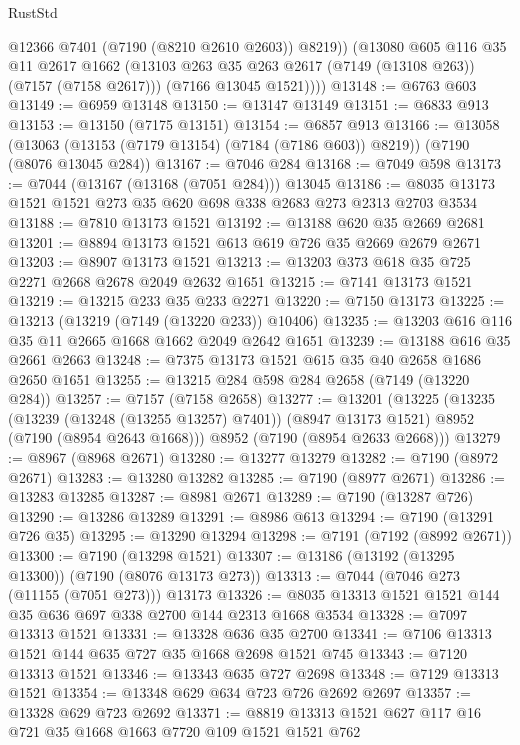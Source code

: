 \begin{lexlean}{RustStd}
\begin{coremodule}
            @12366
            @7401
            (@7190 (@8210 @2610 @2603))
            @8219))
        (@13080
          @605
          @116
          @35
          @11
          @2617
          @1662
          (@13103 @263 @35 @263 @2617 (@7149 (@13108 @263)) (@7157 (@7158 @2617)))
          (@7166 @13045 @1521))))
@13148 := @6763 @603
@13149 := @6959 @13148
@13150 := @13147 @13149
@13151 := @6833 @913
@13153 := @13150 (@7175 @13151)
@13154 := @6857 @913
@13166 := @13058
    (@13063 (@13153 (@7179 @13154) (@7184 (@7186 @603)) @8219))
    (@7190 (@8076 @13045 @284))
@13167 := @7046 @284
@13168 := @7049 @598
@13173 := @7044 (@13167 (@13168 (@7051 @284))) @13045
@13186 := @8035 @13173 @1521 @1521 @273 @35 @620 @698 @338 @2683 @273 @2313 @2703 @3534
@13188 := @7810 @13173 @1521
@13192 := @13188 @620 @35 @2669 @2681
@13201 := @8894 @13173 @1521 @613 @619 @726 @35 @2669 @2679 @2671
@13203 := @8907 @13173 @1521
@13213 := @13203 @373 @618 @35 @725 @2271 @2668 @2678 @2049 @2632 @1651
@13215 := @7141 @13173 @1521
@13219 := @13215 @233 @35 @233 @2271
@13220 := @7150 @13173
@13225 := @13213 (@13219 (@7149 (@13220 @233)) @10406)
@13235 := @13203 @616 @116 @35 @11 @2665 @1668 @1662 @2049 @2642 @1651
@13239 := @13188 @616 @35 @2661 @2663
@13248 := @7375 @13173 @1521 @615 @35 @40 @2658 @1686 @2650 @1651
@13255 := @13215 @284 @598 @284 @2658 (@7149 (@13220 @284))
@13257 := @7157 (@7158 @2658)
@13277 := @13201
    (@13225
      (@13235
        (@13239 (@13248 (@13255 @13257) @7401))
        (@8947 @13173 @1521)
        @8952
        (@7190 (@8954 @2643 @1668)))
      @8952
      (@7190 (@8954 @2633 @2668)))
@13279 := @8967 (@8968 @2671)
@13280 := @13277 @13279
@13282 := @7190 (@8972 @2671)
@13283 := @13280 @13282
@13285 := @7190 (@8977 @2671)
@13286 := @13283 @13285
@13287 := @8981 @2671
@13289 := @7190 (@13287 @726)
@13290 := @13286 @13289
@13291 := @8986 @613
@13294 := @7190 (@13291 @726 @35)
@13295 := @13290 @13294
@13298 := @7191 (@7192 (@8992 @2671))
@13300 := @7190 (@13298 @1521)
@13307 := @13186 (@13192 (@13295 @13300)) (@7190 (@8076 @13173 @273))
@13313 := @7044 (@7046 @273 (@11155 (@7051 @273))) @13173
@13326 := @8035 @13313 @1521 @1521 @144 @35 @636 @697 @338 @2700 @144 @2313 @1668 @3534
@13328 := @7097 @13313 @1521
@13331 := @13328 @636 @35 @2700
@13341 := @7106 @13313 @1521 @144 @635 @727 @35 @1668 @2698 @1521 @745
@13343 := @7120 @13313 @1521
@13346 := @13343 @635 @727 @2698
@13348 := @7129 @13313 @1521
@13354 := @13348 @629 @634 @723 @726 @2692 @2697
@13357 := @13328 @629 @723 @2692
@13371 := @8819 @13313 @1521 @627 @117 @16 @721 @35 @1668 @1663 @7720 @109 @1521 @1521 @762

\end{coremodule}
\end{lexlean}
